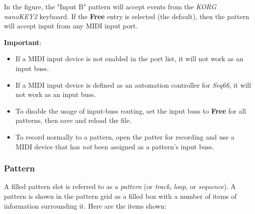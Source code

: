    In the figure, the "Input B" pattern will accept events from
   the \textsl{KORG nanoKEY2} keyboard.
   If the \textbf{Free} entry is selected (the default), then
   the pattern will accept input from any MIDI input port.

   \textbf{Important}:
   \begin{itemize}
      \item If a MIDI input device is not enabled in the port list,
         it will not work as an input buss.
      \item If a MIDI input device is defined as an automation controller for
         \textsl{Seq66}, it will not work as an input buss.
      \item To disable the usage of input-buss routing, set the input buss
         to \textbf{Free} for all patterns, then save and reload the file.
      \item To record normally to a pattern, open the patter for recording
         and use a MIDI device that has \textsl{not} been assigned as
         a pattern's input buss.
   \end{itemize}
   
\subsubsection{Pattern}
\label{subsubsec:patterns_pattern_filled}

   A filled pattern slot is referred to as a \textsl{pattern}
   (or \textsl{track}, \textsl{loop}, or \textsl{sequence}).
   A pattern is shown in the pattern grid as a filled box with a number of
   items of information surrounding it.  Here are the items shown:

